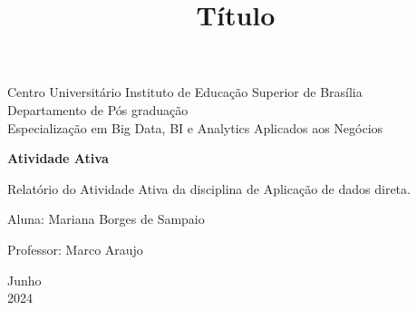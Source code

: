 \documentclass[a4paper, 12pt]{article}
\begin{document}
\begin{titlepage}
	\begin{center}
	

		\Huge{Centro Universitário Instituto de Educação Superior de Brasília}\\
		\large{Departamento de Pós graduação}\\ 
		\large{Especialização em Big Data, BI e Analytics Aplicados aos Negócios}\\ 
\vspace{12pt}
        
        \vspace{70pt}
        
		\textbf{\LARGE{Atividade Ativa}}
		\title{\large{Título}}
			
	\end{center}
\vspace{1,5cm}
	
	\begin{flushright}

   \begin{list}{}{
      \setlength{\leftmargin}{4.5cm}
      \setlength{\rightmargin}{0cm}
      \setlength{\labelwidth}{0pt}
      \setlength{\labelsep}{\leftmargin}}

      \item Relatório do Atividade Ativa da disciplina de Aplicação de dados direta.
      \begin{list}{}{
      \setlength{\leftmargin}{0cm}
      \setlength{\rightmargin}{0cm}
      \setlength{\labelwidth}{0pt}
      \setlength{\labelsep}{\leftmargin}}

			\item Aluna: Mariana Borges de Sampaio \
            \item Professor: Marco Araujo \

      \end{list}
   \end{list}
\end{flushright}
\vspace{1cm}
\begin{center}
		\vspace{\fill}
		 Junho\\
		 2024
			\end{center}
\end{titlepage}
\newpage
\newpage
\tableofcontents
\thispagestyle{empty}
\end{document}
